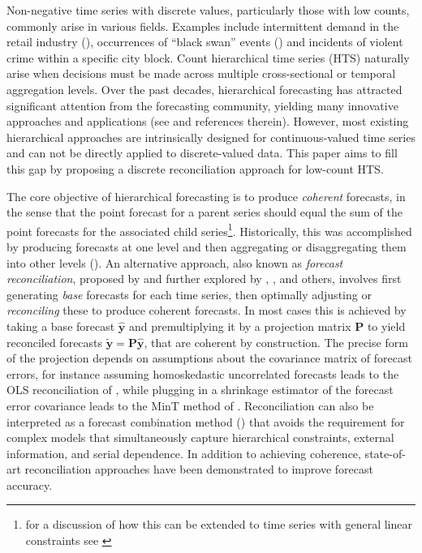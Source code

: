 \documentclass[a4paper,review,12pt,authoryear]{elsarticle}
\theoremstyle{definition}
\begin{document}
Non-negative time series with discrete values, particularly those with low counts, commonly arise in various fields.
Examples include intermittent demand in the retail industry (\citealp{kourentzesElucidateStructureIntermittent2021}), occurrences of ``black swan'' events (\citealp{nikolopoulosWeNeedTalk2020}) and incidents of violent crime within a specific city block.
Count hierarchical time series (HTS) naturally arise when decisions must be made across multiple cross-sectional or temporal aggregation levels. Over the past decades, hierarchical forecasting has attracted significant attention from the forecasting community, yielding many innovative approaches and applications (see \citealp{athanasopoulosForecastReconciliationReview2023} and references therein). However, most existing hierarchical approaches are intrinsically designed for continuous-valued time series and can not be directly applied to discrete-valued data. This paper aims to fill this gap by proposing a discrete reconciliation approach for low-count HTS.

The core objective of hierarchical forecasting is to produce \textit{coherent} forecasts,
in the sense that the point forecast for a parent series should equal the sum of the point forecasts for the associated child series\footnote{for a discussion of how this can be extended to time series with general linear constraints see \cite{girolimetto2023point}}. Historically, this was accomplished by producing forecasts at one level
and then aggregating or disaggregating them into other levels (\citealp{fliednerHierarchicalForecastingIssues2001}).
An alternative approach, also known as \textit{forecast reconciliation}, proposed by \cite{hyndmanOptimalCombinationForecasts2011} and further explored by \cite{wickramasuriyaOptimalForecastReconciliation2019}, \cite{panagiotelisForecastReconciliationGeometric2021}, and others, involves
first generating \textit{base} forecasts for each time series,
then optimally adjusting or \textit{reconciling} these to produce coherent forecasts. In most cases this is achieved by taking a base forecast $\hat{\bm{y}}$ and premultiplying it by a projection matrix $\mathbf{P}$ to yield reconciled forecasts $\tilde{\bm{y}}=\mathbf{P}\hat{\bm{y}}$, that are coherent by construction. The precise form of the projection depends on assumptions about the covariance matrix of forecast errors, for instance assuming homoskedastic uncorrelated forecasts leads to the OLS reconciliation of \cite{hyndmanOptimalCombinationForecasts2011}, while plugging in a shrinkage estimator of the forecast error covariance leads to the MinT method of \cite{wickramasuriyaOptimalForecastReconciliation2019}. Reconciliation can also be interpreted as a forecast combination method (\citealp{hollymanUnderstandingForecastReconciliation2021}) that avoids the requirement for complex models that simultaneously capture hierarchical constraints, external information, and serial dependence. In addition to achieving coherence, state-of-art reconciliation approaches have been demonstrated to improve forecast accuracy.
\end{document}

